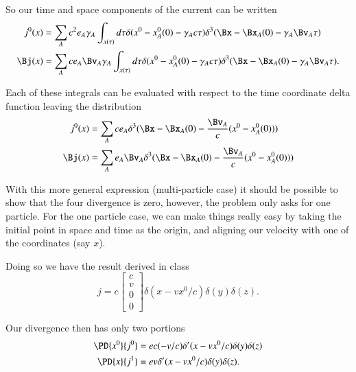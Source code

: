 {So our time and space components of the current can be written
%
\begin{equation}\label{eqn:relElectroDynProblemSet3:2000}
\begin{aligned}
j^0(x) &= \sum_A c^2 e_A \gamma_A \int_{x(\tau)} d\tau
\delta(x^0 - x_A^0(0) - \gamma_A c \tau)
\delta^3(\Bx - \Bx_A(0) - \gamma_A \Bv_A \tau) \\
\Bj(x) &= \sum_A c e_A \Bv_A \gamma_A \int_{x(\tau)} d\tau
\delta(x^0 - x_A^0(0) - \gamma_A c \tau)
\delta^3(\Bx - \Bx_A(0) - \gamma_A \Bv_A \tau).
\end{aligned}
\end{equation}

Each of these integrals can be evaluated with respect to the time coordinate delta function leaving the distribution
%
\begin{equation}\label{eqn:relElectroDynProblemSet3:2020}
\begin{aligned}
j^0(x) &= \sum_A c e_A
\delta^3(\Bx - \Bx_A(0) - \frac{\Bv_A}{c} (x^0 - x_A^0(0))) \\
\Bj(x) &= \sum_A e_A \Bv_A
\delta^3(\Bx - \Bx_A(0) - \frac{\Bv_A}{c} (x^0 - x_A^0(0)))
\end{aligned}
\end{equation}

With this more general expression (multi-particle case) it should be possible to show that the four divergence is zero, however, the problem only asks for one particle.  For the one particle case, we can make things really easy by taking the initial point in space and time as the origin, and aligning our velocity with one of the coordinates (say \(x\)).

Doing so we have the result derived in class
%
\begin{equation}\label{eqn:relElectroDynProblemSet3:2040}
j = e
\begin{bmatrix}
c \\
v \\
0 \\
0
\end{bmatrix}
\delta(x - v x^0/c)
\delta(y)
\delta(z).
\end{equation}

Our divergence then has only two portions
%
\begin{equation}\label{eqn:relElectroDynProblemSet3:2060}
\begin{aligned}
\PD{x^0}{j^0} &= e c (-v/c) \delta'(x - v x^0/c) \delta(y) \delta(z) \\
\PD{x}{j^1} &= e v \delta'(x - v x^0/c) \delta(y) \delta(z).
\end{aligned}
\end{equation}

}
